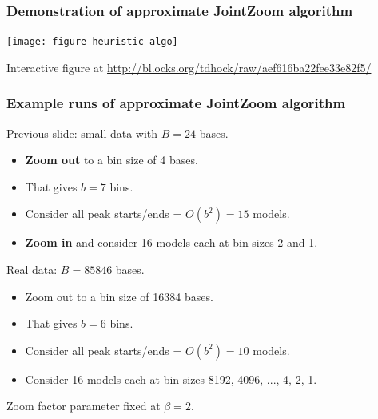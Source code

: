 \documentclass{beamer}
\begin{document}
\begin{frame}
  \frametitle{Demonstration of approximate JointZoom algorithm}

  \texttt{[image: figure-heuristic-algo]}

  Interactive figure at
  \url{http://bl.ocks.org/tdhock/raw/aef616ba22fee33e82f5/}
\end{frame}

\begin{frame}
  \frametitle{Example runs of approximate JointZoom algorithm}
Previous slide: small data with $B=24$ bases.
\begin{itemize}
\item \textbf{Zoom out} to a bin size of 4 bases.
\item That gives $b=7$ bins.
\item Consider all peak starts/ends = $O(b^2)=15$ models.
\item \textbf{Zoom in} and consider 16 models each at bin sizes 2 and 1.
\end{itemize}
Real data: $B=85846$ bases.
\begin{itemize}
\item Zoom out to a bin size of 16384 bases.
\item That gives $b=6$ bins.
\item Consider all peak starts/ends = $O(b^2)=10$ models.
\item Consider 16 models each at bin sizes 8192, 4096, ..., 4, 2, 1.
\end{itemize}
  Zoom factor parameter fixed at $\beta=2$.
\end{frame}
\end{document}
